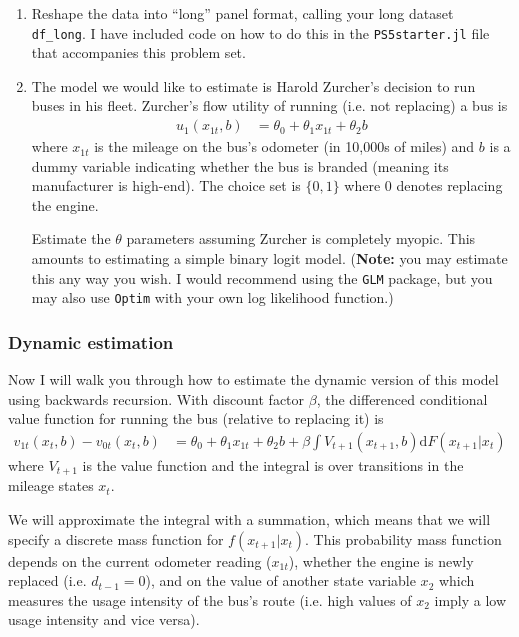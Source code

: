 \documentclass[12pt,english]{article}
\begin{document}
\begin{enumerate}
\item Reshape the data into ``long'' panel format, calling your long dataset \texttt{df\_long}. I have included code on how to do this in the \texttt{PS5starter.jl} file that accompanies this problem set.

\item The model we would like to estimate is Harold Zurcher's decision to run buses in his fleet. Zurcher's flow utility of running (i.e. not replacing) a bus is
\begin{align}\label{eq:flowutil}
    u_{1}\left(x_{1t},b\right) &= \theta_0 + \theta_1 x_{1t} + \theta_2 b
\end{align}
where $x_{1t}$ is the mileage on the bus's odometer (in 10,000s of miles) and $b$ is a dummy variable indicating whether the bus is branded (meaning its manufacturer is high-end). The choice set is $\{0,1\}$ where $0$ denotes replacing the engine.

Estimate the $\theta$ parameters assuming Zurcher is completely myopic. This amounts to estimating a simple binary logit model. (\textbf{Note:} you may estimate this any way you wish. I would recommend using the \texttt{GLM} package, but you may also use \texttt{Optim} with your own log likelihood function.)
\end{enumerate}


\subsubsection*{Dynamic estimation}

Now I will walk you through how to estimate the dynamic version of this model using backwards recursion. With discount factor $\beta$, the differenced conditional value function for running the bus (relative to replacing it) is
\begin{align}\label{eq:condv}
    v_{1t}\left(x_{t},b\right)-v_{0t}\left(x_{t},b\right) &= \theta_0 + \theta_1 x_{1t} + \theta_2 b + \beta \int V_{t+1}\left(x_{t+1},b\right) \mathrm{d}F\left(x_{t+1}\vert x_{t}\right)
\end{align}
where $V_{t+1}$ is the value function and the integral is over transitions in the mileage states $x_{t}$.

We will approximate the integral with a summation, which means that we will specify a discrete mass function for $f\left(x_{t+1}\vert x_{t}\right)$. This probability mass function depends on the current odometer reading ($x_{1t}$), whether the engine is newly replaced (i.e. $d_{t-1} = 0$), and on the value of another state variable $x_2$ which measures the usage intensity of the bus's route (i.e. high values of $x_2$ imply a low usage intensity and vice versa).  
\end{document}
